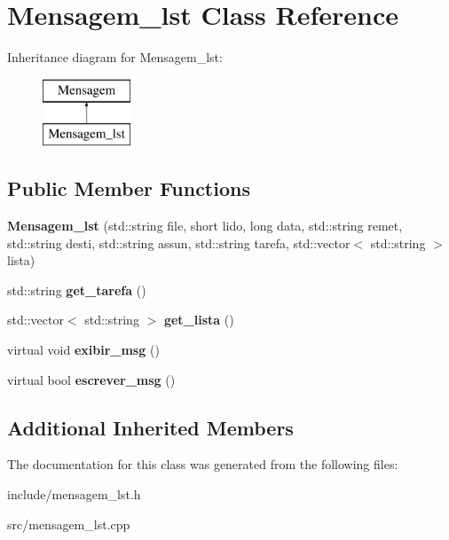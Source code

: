 \hypertarget{class_mensagem__lst}{}\section{Mensagem\+\_\+lst Class Reference}
\label{class_mensagem__lst}
Inheritance diagram for Mensagem\+\_\+lst\+:\begin{figure}[H]
\begin{center}
\leavevmode
\includegraphics[height=2.000000cm]{class_mensagem__lst}
\end{center}
\end{figure}
\subsection*{Public Member Functions}
\begin{DoxyCompactItemize}
\item 
\mbox{\label{class_mensagem__lst_ad66160c7ee3fa7966bcd378c7447695c}} 
{\bfseries Mensagem\+\_\+lst} (std\+::string file, short lido, long data, std\+::string remet, std\+::string desti, std\+::string assun, std\+::string tarefa, std\+::vector$<$ std\+::string $>$ lista)
\item 
\mbox{\label{class_mensagem__lst_a40ddf4873712bcce25555bd2f4a42380}} 
std\+::string {\bfseries get\+\_\+tarefa} ()
\item 
\mbox{\label{class_mensagem__lst_ab32cb5b7a444d228c47e2bd21ad668a5}} 
std\+::vector$<$ std\+::string $>$ {\bfseries get\+\_\+lista} ()
\item 
\mbox{\label{class_mensagem__lst_a2a75f0cde752151f0ec34c5f934de5a6}} 
virtual void {\bfseries exibir\+\_\+msg} ()
\item 
\mbox{\label{class_mensagem__lst_a26df921873145c817406ae45dde0ef5a}} 
virtual bool {\bfseries escrever\+\_\+msg} ()
\end{DoxyCompactItemize}
\subsection*{Additional Inherited Members}


The documentation for this class was generated from the following files\+:\begin{DoxyCompactItemize}
\item 
include/mensagem\+\_\+lst.\+h\item 
src/mensagem\+\_\+lst.\+cpp\end{DoxyCompactItemize}
